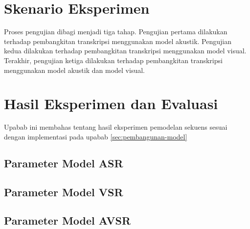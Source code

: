 \section{Skenario Eksperimen}

Proses pengujian dibagi menjadi tiga tahap. Pengujian pertama dilakukan terhadap pembangkitan transkripsi menggunakan model akustik. Pengujian kedua dilakukan terhadap pembangkitan transkripsi menggunakan model visual. Terakhir, pengujian ketiga dilakukan terhadap pembangkitan transkripsi menggunakan model akustik dan model visual.

\section{Hasil Eksperimen dan Evaluasi}

Upabab ini membahas tentang hasil eksperimen pemodelan sekuens sesuai dengan implementasi pada upabab \ref{sec:pembangunan-model}

\subsection{Parameter Model ASR}

\subsection{Parameter Model VSR}

\subsection{Parameter Model AVSR}